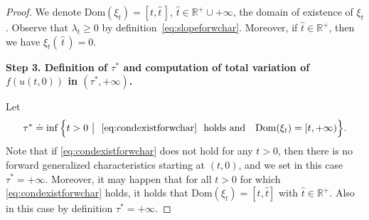 \documentclass[a4paper, 10pt, final]{article}
\newcommand{\R}{\mathbb{R}} \newcommand{\N}{\mathbb{N}}
\begin{document}
\begin{proof}
  We denote $\text{Dom}(\xi_t)=[t, \hat t\,]$, $\hat t\in \R^+\cup{+\infty}$, the domain of existence of
  $\xi_t$.
  Observe that $\lambda_t\geq 0$ by definition~\eqref{eq:slopeforwchar}.
  Moreover, if $\hat t\in \R^+$, then we have
  $\xi_t(\,\hat t\,)=0$. 
 
  \smallskip


  \noindent
  {\bf Step 3. Definition of   $\tau^*$ and computation of total variation of $f(u(t,0))$ in $(\tau^*, +\infty)$.} 

  Let 
  \begin{equation}
      \tau^*\doteq\inf\Big\{t>0~\big|~~\eqref{eq:condexistforwchar} \ \  \text{holds and}\quad \text{Dom}(\xi_t)=[t, +\infty) \Big\}.
      \label{eq:tau*def}
  \end{equation}
  Note that if \eqref{eq:condexistforwchar} does not hold for any $t>0$, 
  then there is no   forward generalized characteristics starting at $(t,0)$,
  and we set in this case $\tau^*=+\infty$. 
  Moreover, it may happen that for all $t>0$ for which \eqref{eq:condexistforwchar} holds, 
  it holds that $\text{Dom}(\xi_t)=[t, \hat t]$ with $\hat t\in \R^+$. 
  Also in this case by definition $\tau^*=+\infty$.


\end{proof}
\end{document}

